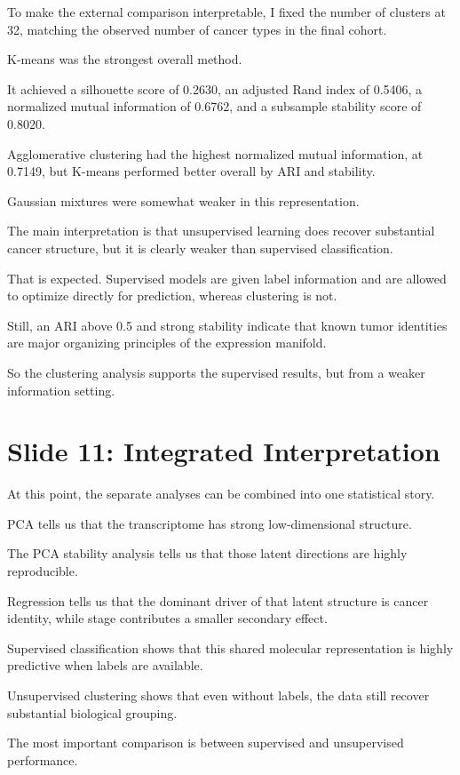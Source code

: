 \documentclass[12pt]{article}
\begin{document}
To make the external comparison interpretable, I fixed the number of clusters at 32, matching the observed number of cancer types in the final cohort.

K-means was the strongest overall method.

It achieved a silhouette score of 0.2630, an adjusted Rand index of 0.5406, a normalized mutual information of 0.6762, and a subsample stability score of 0.8020.

Agglomerative clustering had the highest normalized mutual information, at 0.7149, but K-means performed better overall by ARI and stability.

Gaussian mixtures were somewhat weaker in this representation.

The main interpretation is that unsupervised learning does recover substantial cancer structure, but it is clearly weaker than supervised classification.

That is expected. Supervised models are given label information and are allowed to optimize directly for prediction, whereas clustering is not.

Still, an ARI above 0.5 and strong stability indicate that known tumor identities are major organizing principles of the expression manifold.

So the clustering analysis supports the supervised results, but from a weaker information setting.

\section{Slide 11: Integrated Interpretation}
At this point, the separate analyses can be combined into one statistical story.

PCA tells us that the transcriptome has strong low-dimensional structure.

The PCA stability analysis tells us that those latent directions are highly reproducible.

Regression tells us that the dominant driver of that latent structure is cancer identity, while stage contributes a smaller secondary effect.

Supervised classification shows that this shared molecular representation is highly predictive when labels are available.

Unsupervised clustering shows that even without labels, the data still recover substantial biological grouping.

The most important comparison is between supervised and unsupervised performance.
\end{document}
